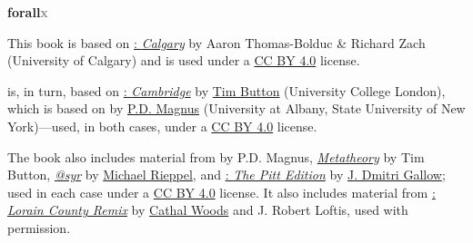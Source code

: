 

\graphicspath{{assets/}}

\pagestyle{empty}

\vspace*{65mm}

\begin{raggedleft}
\sffamily
{\Huge\textbf{{forall\hspace{.08em}\textcolor{gray}{x}}}}

\bigskip
{\large{\textcolor{maroon}{\uppercase{}}}}  

\bigskip







\vfill
{\small{\forallxversion}}\par 	%

\end{raggedleft}

\newpage 

\vspace*{\fill}

\noindent \small This book is based on \href{http://forallx.openlogicproject.org/}{\forallx:\emph{ Calgary}} by {Aaron Thomas-Bolduc \& Richard Zach} ({University of Calgary}) and is used under a \href{https://creativecommons.org/licenses/by/4.0/}{CC BY 4.0} license.
\medskip

 is, in turn, based on \href{http://www.homepages.ucl.ac.uk/~uctytbu/OERs.html}{\forallx:\emph{ Cambridge}} by \href{http://www.homepages.ucl.ac.uk/~uctytbu/}{Tim Button} ({University College London}), 
which is based on \href{https://www.fecundity.com/logic/}{\forallx} by \href{https://www.fecundity.com/job/}{P.D. Magnus} (University at Albany, State University of New York)---used, in both cases, under a \href{https://creativecommons.org/licenses/by/4.0/}{CC BY 4.0} license.
\medskip

\noindent The book also includes material from \forallx{} by P.D. Magnus, \href{http://www.homepages.ucl.ac.uk/~uctytbu/OERs.html}{\emph{Metatheory}} by Tim Button, 
\href{https://mrieppel.net/teaching/index.html#forallx}{\forallx\emph{@syr}} by \href{https://mrieppel.net/index.html}{Michael Rieppel}, and \href{http://jdmitrigallow.com/teaching/logic19/text.pdf}{\forallx:\emph{ The Pitt Edition}} by \href{https://jdmitrigallow.com/}{J. Dmitri Gallow}; used in each case under a \href{https://creativecommons.org/licenses/by/4.0/}{CC BY 4.0} license. It also includes material from  
\href{https://github.com/rob-helpy-chalk/openintroduction}{\forallx: \emph{Lorain County Remix}} by \href{https://sites.google.com/site/cathalwoods/}{Cathal Woods} and J. Robert Loftis, used with permission.
\bigskip

